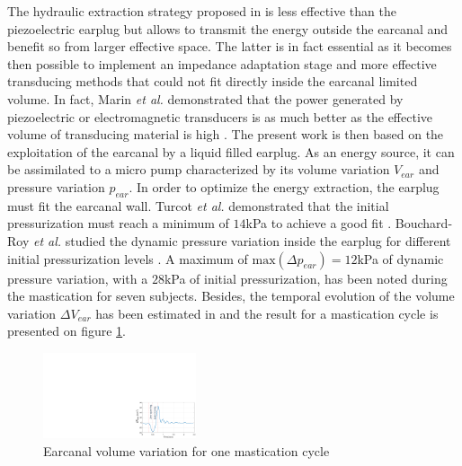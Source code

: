 \documentclass[3p,twocolumn,preprint]{elsarticle}
\begin{document}
The hydraulic extraction strategy proposed in \cite{Delnavaz2012} is less effective than the piezoelectric earplug but allows to transmit the energy outside the earcanal and benefit so from larger effective space. The latter is in fact essential as it becomes then possible to implement an impedance adaptation stage and more effective transducing methods that could not fit directly inside the earcanal limited volume. In fact, Marin \emph{et al.} demonstrated that the power generated by piezoelectric or electromagnetic transducers is as much better as the effective volume of transducing material is high \cite{Marin2011}. The present work is then based on the exploitation of the earcanal by a liquid filled earplug. As an energy source, it can be assimilated to a micro pump characterized by its volume variation $V_{ear}$ and pressure variation $p_{ear}$. In order to optimize the energy extraction, the earplug must fit the earcanal wall. Turcot \emph{et al.} demonstrated that the initial pressurization must reach a minimum of $14$kPa to achieve a good fit \cite{TURCOT2011}. Bouchard-Roy \emph{et al.} studied the dynamic pressure variation inside the earplug for different initial pressurization levels \cite{Bouchard-Roy2020}. A maximum of $\text{max}(\Delta p_{ear})=12$kPa of dynamic pressure variation, with a $28$kPa of initial pressurization, has been noted during the mastication for seven subjects. Besides, the temporal evolution of the volume variation $\Delta V_{ear}$ has been estimated in \cite{Delnavaz2012} and the result for a mastication cycle is presented on figure \ref{fig:deltaV_ear}.
\begin{figure}[!htbp]
	\centering
	\captionsetup{justification=centering}
	\includegraphics[trim={20.5cm 0cm 0cm 10.8cm},clip, width=0.4\textwidth]{figures/deltaV_ear.pdf}
	\caption{Earcanal volume variation for one mastication cycle}
	\label{fig:deltaV_ear}
\end{figure}
\end{document}
